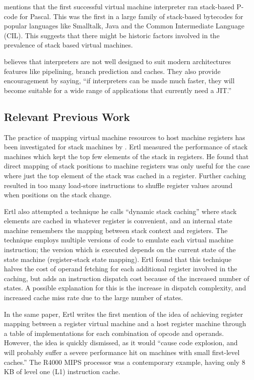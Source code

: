 		\cite{caseregistervm} mentions that the first successful virtual machine interpreter ran stack-based P-code for Pascal. This was the first in a large family of stack-based bytecodes for popular languages like Smalltalk, Java and the Common Intermediate Language (CIL). This suggests that there might be historic factors involved in the prevalence of stack based virtual machines.
		
		\cite{fastjava} believes that interpreters are not well designed to suit modern architectures features like pipelining, branch prediction and caches. They also provide encouragement by saying, ``if interpreters can be made much faster, they will become suitable for a wide range of applications that currently need a JIT.''
		
		\subsection{Relevant Previous Work}
		The practice of mapping virtual machine resources to host machine registers has been investigated for stack machines by \cite{stackcaching}. Ertl measured the performance of stack machines which kept the top few elements of the stack in registers. He found that direct mapping of stack positions to machine registers was only useful for the case where just the top element of the stack was cached in a register. Further caching resulted in too many load-store instructions to shuffle register values around when positions on the stack change.
		
		Ertl also attempted a technique he calls ``dynamic stack caching'' where stack elements are cached in whatever register is convenient, and an internal state machine remembers the mapping between stack context and registers. The technique employs multiple versions of code to emulate each virtual machine instruction; the version which is executed depends on the current state of the state machine (register-stack state mapping). Ertl found that this technique halves the cost of operand fetching for each additional register involved in the caching, but adds an instruction dispatch cost because of the increased number of states. A possible explanation for this is the increase in dispatch complexity, and increased cache miss rate due to the large number of states.
		
		In the same paper, Ertl writes the first mention of the idea of achieving register mapping between a register virtual machine and a host register machine through a table of implementations for each combination of opcode and operands. However, the idea is quickly dismissed, as it would ``cause code explosion, and will probably suffer a severe performance hit on machines with small first-level caches.'' The R4000 MIPS processor was a contemporary example, having only 8 KB of level one (L1) instruction cache.
	
